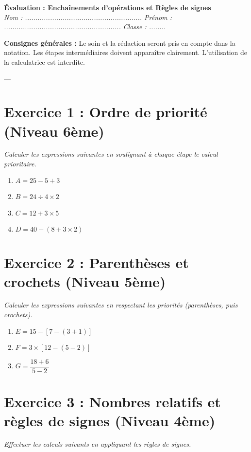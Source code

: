 \documentclass[11pt,a4paper]{article}
\begin{document}
\begin{center}
    {\Large \textbf{Évaluation : Enchaînements d'opérations et Règles de signes}} \\[0.3cm]
    \textit{Nom : ........................................................ \quad Prénom : ........................................................ \quad Classe : ........}
\end{center}

\vspace{0.5cm}

\noindent \textbf{Consignes générales :} Le soin et la rédaction seront pris en compte dans la notation. Les étapes intermédiaires doivent apparaître clairement. L'utilisation de la calculatrice est interdite.

---

\section*{Exercice 1 : Ordre de priorité (Niveau 6ème)}
\textit{Calculer les expressions suivantes en soulignant à chaque étape le calcul prioritaire.}

\begin{enumerate}
    \item $A = 25 - 5 + 3$
    \item $B = 24 \div 4 \times 2$
    \item $C = 12 + 3 \times 5$
    \item $D = 40 - (8 + 3 \times 2)$
\end{enumerate}

\vspace{1cm}

\section*{Exercice 2 : Parenthèses et crochets (Niveau 5ème)}
\textit{Calculer les expressions suivantes en respectant les priorités (parenthèses, puis crochets).}

\begin{enumerate}
    \item $E = 15 - [7 - (3 + 1)]$
    \item $F = 3 \times [12 - (5 - 2)]$
    \item $G = \dfrac{18 + 6}{5 - 2}$
\end{enumerate}

\vspace{1cm}

\section*{Exercice 3 : Nombres relatifs et règles de signes (Niveau 4ème)}
\textit{Effectuer les calculs suivants en appliquant les règles de signes.}
\end{document}

